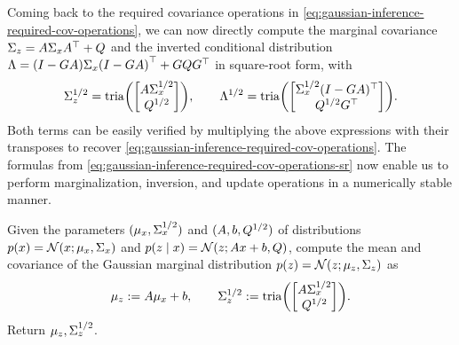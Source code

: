 \documentclass{mimosis}
\begin{document}
Coming back to the required covariance operations in
\cref{eq:gaussian-inference-required-cov-operations},
we can now directly compute
the marginal covariance \(\Sigma_{z} = A \Sigma_{x} A^\top + Q\)
and the inverted conditional distribution
\({\invtransC = \left( I - \invtransA \transA \right) \cov{\st} \left( I - \invtransA \transA \right)^\T + \invtransA \transC \invtransA^\T}\)
in square-root form, with
\begin{align}
\label{eq:gaussian-inference-required-cov-operations-sr}
\cov{\obs}^{1/2} = \tria( \mqty[ \transA \cov{\st}^{1/2} \\ \transC^{1/2} ] ),
\qquad
\invtransC^{1/2} = \tria( \mqty[ \cov{\st}^{1/2} (I - \invtransA \transA)^\T \\ \transC^{1/2} \invtransA^\T ] ).
\end{align}
Both terms can be easily verified by multiplying the above expressions with their transposes to recover
\cref{eq:gaussian-inference-required-cov-operations}.
The formulas from
\cref{eq:gaussian-inference-required-cov-operations-sr}
now enable us to perform marginalization, inversion, and update operations in a numerically stable manner.

\begin{alg}
\algeqspacing
\label{alg:marginalize}
\label{alg:marginalizesr}
Given the parameters
\((\mu_{x}, \Sigma_{x}^{1/2})\) and
\((A, b, Q^{1/2})\)
of distributions
\({\p( \st ) = \N( \st; \mean{\st}, \cov{\st} )}\)
and
\(\p( \obs \mid \st ) = \N( \obs; \transA \st + \transb, \transC )\),
compute the mean and covariance of the Gaussian marginal distribution
\(\p(\obs) = \N( \obs; \mean{\obs}, \cov{\obs} )\)
as
\begin{align}
  \mean{\obs} := \transA \mean{\st} + \transb, \qquad
  \cov{\obs}^{1/2} := \tria( \begin{bmatrix} \transA \cov{\st}^{1/2} \\ \transC^{1/2} \end{bmatrix} ).
\end{align}
Return \(\mu_{z}, \Sigma_{z}^{1/2}\).
\end{alg}
\end{document}
